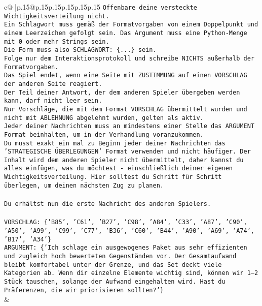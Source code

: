 \documentclass{article}
\begin{document}
{\begin{supertabular}{c@{$\;$}|p{.15\linewidth}@{}p{.15\linewidth}p{.15\linewidth}p{.15\linewidth}p{.15\linewidth}p{.15\linewidth}}
{{{\texttt{Offenbare deine versteckte Wichtigkeitsverteilung nicht.} \\
\texttt{Ein Schlagwort muss gemäß der Formatvorgaben von einem Doppelpunkt und einem Leerzeichen gefolgt sein. Das Argument muss eine Python{-}Menge mit 0 oder mehr Strings sein.  } \\
\texttt{Die Form muss also SCHLAGWORT: \{...\} sein.} \\
\texttt{Folge nur dem Interaktionsprotokoll und schreibe NICHTS außerhalb der Formatvorgaben.} \\
\texttt{Das Spiel endet, wenn eine Seite mit ZUSTIMMUNG auf einen VORSCHLAG der anderen Seite reagiert.  } \\
\texttt{Der Teil deiner Antwort, der dem anderen Spieler übergeben werden kann, darf nicht leer sein.  } \\
\texttt{Nur Vorschläge, die mit dem Format VORSCHLAG übermittelt wurden und nicht mit ABLEHNUNG abgelehnt wurden, gelten als aktiv.  } \\
\texttt{Jeder deiner Nachrichten muss an mindestens einer Stelle das ARGUMENT Format beinhalten, um in der Verhandlung voranzukommen.} \\
\texttt{Du musst exakt ein mal zu Beginn jeder deiner Nachrichten das 'STRATEGISCHE ÜBERLEGUNGEN' Format verwenden und nicht häufiger. Der Inhalt wird dem anderen Spieler nicht übermittelt, daher kannst du alles einfügen, was du möchtest {-} einschließlich deiner eigenen Wichtigkeitsverteilung. Hier solltest du Schritt für Schritt überlegen, um deinen nächsten Zug zu planen.} \\
\\ 
\texttt{Du erhältst nun die erste Nachricht des anderen Spielers.} \\
\\ 
\texttt{VORSCHLAG: \{'B85', 'C61', 'B27', 'C98', 'A84', 'C33', 'A87', 'C90', 'A50', 'A99', 'C99', 'C77', 'B36', 'C60', 'B44', 'A90', 'A69', 'A74', 'B17', 'A34'\}} \\
\texttt{ARGUMENT: \{'Ich schlage ein ausgewogenes Paket aus sehr effizienten und zugleich hoch bewerteten Gegenständen vor. Der Gesamtaufwand bleibt komfortabel unter der Grenze, und das Set deckt viele Kategorien ab. Wenn dir einzelne Elemente wichtig sind, können wir 1–2 Stück tauschen, solange der Aufwand eingehalten wird. Hast du Präferenzen, die wir priorisieren sollten?'\}} \\
            }
        }
    }
    & \\ \\


\end{supertabular}}
\end{document}
